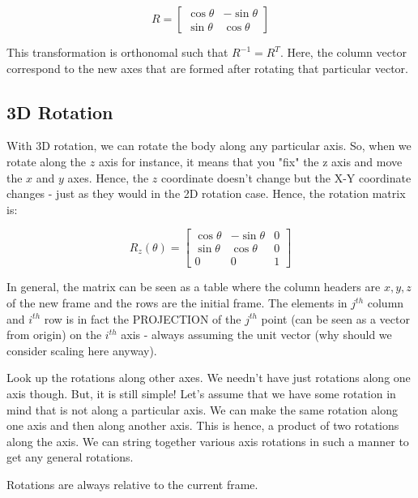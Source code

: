 \begin{equation}
    R = \begin{bmatrix}
    \cos\theta & -\sin\theta \\
    \sin\theta & \cos\theta 
    \end{bmatrix}
\end{equation}

This transformation is orthonomal such that $R^{-1}=R^T$. Here, the column vector correspond to the new axes that are formed after rotating that particular vector.

\subsection{3D Rotation}

With 3D rotation, we can rotate the body along any particular axis. So, when we rotate along the $z$ axis for instance, it means that you "fix" the z axis and move the $x$ and $y$ axes. Hence, the $z$ coordinate doesn't change but the X-Y coordinate changes - just as they would in the 2D rotation case. Hence, the rotation matrix is:

\begin{equation}
    R_{z}(\theta) = \begin{bmatrix} 
    \cos\theta & -\sin\theta & 0 \\
    \sin\theta & \cos\theta & 0 \\
    0 & 0 & 1
    \end{bmatrix}
\end{equation}

In general, the matrix can be seen as a table where the column headers are $x, y, z$ of the new frame and the rows are the initial frame. The elements in $j^{th}$ column and $i^{th}$ row is in fact the PROJECTION of the $j^{th}$ point (can be seen as a vector from origin) on the $i^{th}$ axis - always assuming the unit vector (why should we consider scaling here anyway).

Look up the rotations along other axes. We needn't have just rotations along one axis though. But, it is still simple! Let's assume that we have some rotation in mind that is not along a particular axis. We can make the same rotation along one axis and then along another axis. This is hence, a product of two rotations along the axis. We can string together various axis rotations in such a manner to get any general rotations. 

Rotations are always relative to the current frame.

